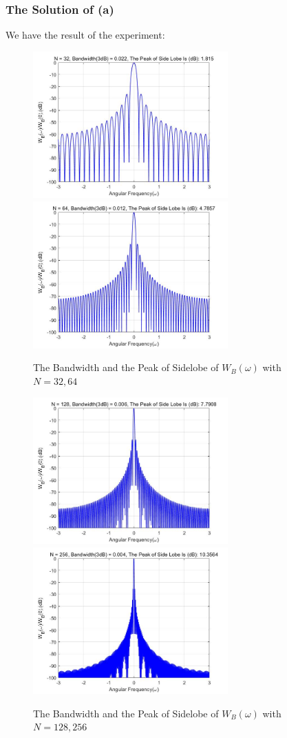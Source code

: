 \documentclass[UTF-8, a4paper, 12pt]{ctexart}
\begin{document}
\subsubsection{The Solution of (a)}
We have the result of the experiment:
\begin{figure}[htbp]
    \centering
    \includegraphics[width=7.5cm]{2/N32.jpg}
    \includegraphics[width=7.5cm]{2/N64.jpg}
    \caption{The Bandwidth and the Peak of Sidelobe of $W_B(\omega)$ with $N=32, 64$}
\end{figure}
\begin{figure}[htbp]
    \centering
    \includegraphics[width=7.5cm]{2/N128.jpg}
    \includegraphics[width=7.5cm]{2/N256.jpg}
    \caption{The Bandwidth and the Peak of Sidelobe of $W_B(\omega)$ with $N=128, 256$}
\end{figure}
\end{document}
